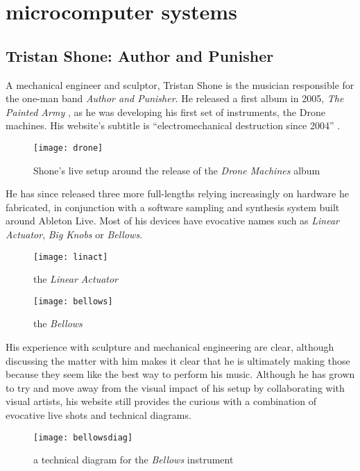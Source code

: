 \section{microcomputer systems}

\subsection{Tristan Shone: Author and Punisher}

A mechanical engineer and sculptor, Tristan Shone is the musician responsible for the one-man band \emph{Author and Punisher}. He released a first album in 2005, \emph{The Painted Army} \citep{shone,2005}, as he was developing his first set of instruments, the Drone machines. His website's subtitle is ``electromechanical destruction since 2004'' \citep{shone2004}.

	\begin{figure}[h!]
	  \caption{Shone's live setup around the release of the \emph{Drone Machines} album}
	  \centering
	    \texttt{[image: drone]}
	\end{figure}
	
He has since released three more full-lengths relying increasingly on hardware he fabricated, in conjunction with a software sampling and synthesis system built around Ableton Live. Most of his devices have evocative names such as \emph{Linear Actuator}, \emph{Big Knobs} or \emph{Bellows}. 

	\begin{figure}[h!]
	  \caption{the \emph{Linear Actuator}}
	  \centering
	    \texttt{[image: linact]}
	\end{figure}

	\begin{figure}[h!]
	  \caption{the \emph{Bellows}}
	  \centering
	    \texttt{[image: bellows]}
	\end{figure}

His experience with sculpture and mechanical engineering are clear, although discussing the matter with him makes it clear that he is ultimately making those because they seem like the best way to perform his music. Although he has grown to try and move away from the visual impact of his setup by collaborating with visual artists, his website still provides the curious with a combination of evocative live shots and technical diagrams. 

	\begin{figure}[h!]
	  \caption{a technical diagram for the \emph{Bellows} instrument}
	  \centering
	    \texttt{[image: bellowsdiag]}
	\end{figure}
	
